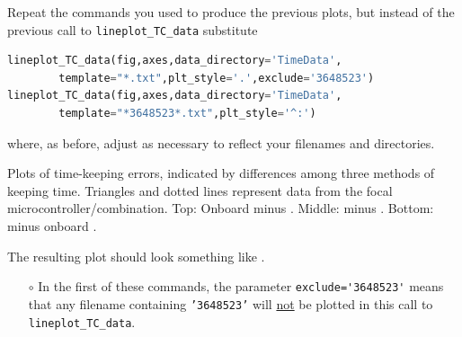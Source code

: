 \begin{enumerate}
	Repeat the commands you used to produce the previous plots, but instead of the previous call to \lstinline{lineplot_TC_data} substitute
\begin{lstlisting}[language=Python]
lineplot_TC_data(fig,axes,data_directory='TimeData',
        template="*.txt",plt_style='.',exclude='3648523')
lineplot_TC_data(fig,axes,data_directory='TimeData', 
        template="*3648523*.txt",plt_style='^:')
\end{lstlisting}
	where, as before, adjust as necessary to reflect your filenames and directories.
	\begin{marginfigure}[-6.cm]
		\begin{center}
			\caption[Plots of time-keeping errors]{Plots of time-keeping errors, indicated by differences among three methods of keeping time. 
			Triangles and dotted lines represent data from the focal microcontroller/\rtc combination. 
			Top: Onboard \rtc minus  \rtc. Middle: \ntp minus  \rtc. Bottom: \ntp minus onboard \rtc. }
		\end{center}
	\end{marginfigure}
	The resulting plot should look something like .
	\begin{itemize}
		\item[$\circ$] In the first of these commands, the parameter \lstinline{exclude='3648523'} means that any filename containing \texttt{'3648523'} will \underline{not} be plotted in this call to \lstinline{lineplot_TC_data}. 
		

\end{itemize}
\end{enumerate}
